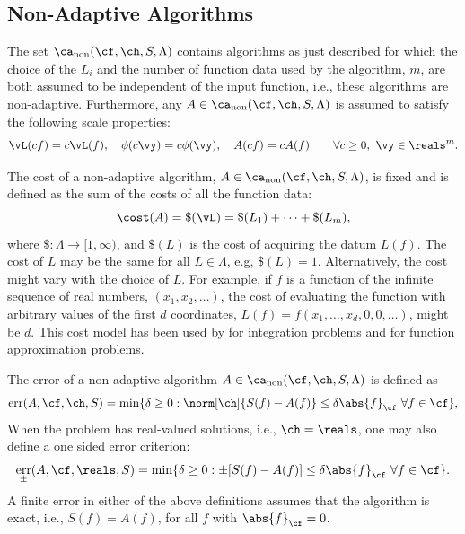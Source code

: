 \documentclass[]{elsarticle}
\DeclareMathOperator{\fix}{non}
\DeclareMathOperator{\err}{err}
\theoremstyle{definition}
\theoremstyle{remark}
\newcommand{\Fnorm}[1]{\abs{#1}_{\cf}}
\begin{document}
\subsection{Non-Adaptive Algorithms} \label{NonAdaptsec}

The set $\ca_{\fix}(\cf,\ch,S,\Lambda)$ contains algorithms as just described for which the choice of the $L_i$ and the number of function data used by the algorithm, $m$, are both assumed to be independent of the input function, i.e., these algorithms are non-adaptive.  Furthermore, any $A \in \ca_{\fix}(\cf,\ch,S,\Lambda)$ is assumed to satisfy the following scale properties:
\begin{equation}
\label{algoscale}
\vL(cf) = c \vL(f), \quad 
\phi(c\vy) = c\phi(\vy), \quad A(cf) = cA(f) \qquad \forall c \ge 0, \ \vy \in \reals^m.
\end{equation}

The cost of a non-adaptive algorithm, $A \in  \ca_{\fix}(\cf,\ch,S,\Lambda)$, is fixed and is defined as the sum of the costs of all the function data:
\begin{equation} \label{costfix}
\cost(A) = \$(\vL) = \$(L_1) + \cdots +\$(L_m),
\end{equation}
where $\$:\Lambda \to [1,\infty)$, and $\$(L)$ is the cost of acquiring the datum $L(f)$. The cost of $L$ may be the same for all $L \in \Lambda$, e.g, $\$(L)=1$.  Alternatively, the cost might vary with the choice of $L$.  For example, if $f$ is a function of the infinite sequence of real numbers, $(x_1, x_2, \ldots)$, the cost of evaluating the function with arbitrary values of the first $d$ coordinates, $L(f)=f(x_1, \ldots, x_d, 0, 0, \ldots)$, might be $d$.  This cost model has been used by \cite{HicMGRitNiu09a,KuoEtal10a,NiuHic09a,NiuHic09b,PlaWas11a} for integration problems and \cite{Was13a,WasWoz11a,WasWoz11b} for function approximation problems.

The error of a non-adaptive algorithm $A  \in \ca_{\fix}(\cf,\ch,S,\Lambda)$ is defined  as
\begin{equation} \label{errdefworst}
\err(A,\cf,\ch,S)
= \min\{ \delta \ge 0 : \norm[\ch]{S(f) -  A(f)} \le \delta \Fnorm{f} \ \forall f \in \cf \},
\end{equation}
When the problem has real-valued solutions, i.e., $\ch=\reals$, one may also define a one sided error criterion:
\begin{equation}\label{errpmdefworst}
\err_{\pm}(A,\cf,\reals,S) = 
\min \{ \delta \ge 0 : \pm[S(f) -  A(f)] \le \delta \Fnorm{f} \ \forall f \in \cf \}. 
\end{equation}
A finite error in either of the above definitions assumes that the algorithm is exact, i.e., $S(f)=A(f)$, for all $f$ with $\Fnorm{f}=0$.
\end{document}
